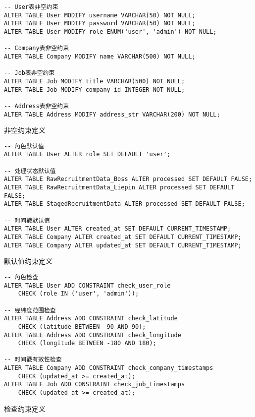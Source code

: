 \begin{listing}[htbp]
    \begin{verbatim}
-- User表非空约束
ALTER TABLE User MODIFY username VARCHAR(50) NOT NULL;
ALTER TABLE User MODIFY password VARCHAR(50) NOT NULL;
ALTER TABLE User MODIFY role ENUM('user', 'admin') NOT NULL;

-- Company表非空约束
ALTER TABLE Company MODIFY name VARCHAR(500) NOT NULL;

-- Job表非空约束
ALTER TABLE Job MODIFY title VARCHAR(500) NOT NULL;
ALTER TABLE Job MODIFY company_id INTEGER NOT NULL;

-- Address表非空约束
ALTER TABLE Address MODIFY address_str VARCHAR(200) NOT NULL;
    \end{verbatim}
    \caption{非空约束定义}\label{lst:not_null_constraints}
  \end{listing}

\begin{listing}[htbp]
    \begin{verbatim}
-- 角色默认值
ALTER TABLE User ALTER role SET DEFAULT 'user';

-- 处理状态默认值
ALTER TABLE RawRecruitmentData_Boss ALTER processed SET DEFAULT FALSE;
ALTER TABLE RawRecruitmentData_Liepin ALTER processed SET DEFAULT FALSE;
ALTER TABLE StagedRecruitmentData ALTER processed SET DEFAULT FALSE;

-- 时间戳默认值
ALTER TABLE User ALTER created_at SET DEFAULT CURRENT_TIMESTAMP;
ALTER TABLE Company ALTER created_at SET DEFAULT CURRENT_TIMESTAMP;
ALTER TABLE Company ALTER updated_at SET DEFAULT CURRENT_TIMESTAMP;
    \end{verbatim}
    \caption{默认值约束定义}\label{lst:default_constraints}
  \end{listing}

\begin{listing}[htbp]
    \begin{verbatim}
-- 角色检查
ALTER TABLE User ADD CONSTRAINT check_user_role 
    CHECK (role IN ('user', 'admin'));

-- 经纬度范围检查
ALTER TABLE Address ADD CONSTRAINT check_latitude
    CHECK (latitude BETWEEN -90 AND 90);
ALTER TABLE Address ADD CONSTRAINT check_longitude
    CHECK (longitude BETWEEN -180 AND 180);

-- 时间戳有效性检查
ALTER TABLE Company ADD CONSTRAINT check_company_timestamps
    CHECK (updated_at >= created_at);
ALTER TABLE Job ADD CONSTRAINT check_job_timestamps
    CHECK (updated_at >= created_at);
    \end{verbatim}
    \caption{检查约束定义}\label{lst:check_constraints}
  \end{listing}

